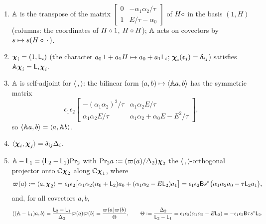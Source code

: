 \begin{prop}
\label{prop:lea-A}
\begin{enumerate}
\item $\mathbb{A}$ is the transpose of the matrix $\begin{bmatrix}0 & -\alpha_1\alpha_2/\tau\\ 1 & E/\tau-\alpha_0\end{bmatrix}$ of $H\circ$ in the basis $(1,H)$ (columns: the coordinates of $H\circ 1$, $H\circ H$); $\mathbb{A}$ acts on covectors by $s\mapsto s(H\circ\,\cdot\,)$.
\item $\boldsymbol{\chi}_i = (1,\mathsf{L}_i)$ (the character $a_0\,1 + a_1H\mapsto a_0 + a_1\mathsf{L}_i$; $\boldsymbol{\chi}_i(\mathfrak{e}_j) = \delta_{ij}$) satisfies $\mathbb{A}\boldsymbol{\chi}_i = \mathsf{L}_i\boldsymbol{\chi}_i$.
\item $\mathbb{A}$ is self-adjoint for $\langle\,,\rangle$: the bilinear form $(a,b)\mapsto\langle\mathbb{A} a,b\rangle$ has the symmetric matrix
\[
\epsilon_1\epsilon_2\begin{bmatrix}-(\alpha_1\alpha_2)^2/\tau & \alpha_1\alpha_2E/\tau\\ \alpha_1\alpha_2E/\tau & \alpha_1\alpha_2+\alpha_0E - E^2/\tau\end{bmatrix},
\]
so $\langle\mathbb{A} a,b\rangle = \langle a,\mathbb{A} b\rangle$.
\item $\langle\boldsymbol{\chi}_i,\boldsymbol{\chi}_j\rangle = \delta_{ij}\Delta_i$.
\item $\mathbb{A} - \mathsf{L}_1 = (\mathsf{L}_2-\mathsf{L}_1)\mathrm{Pr}_2$ with $\mathrm{Pr}_2a := (\varpi(a)/\Delta_2)\boldsymbol{\chi}_2$ the $\langle\,,\rangle$-orthogonal projector onto $\mathbb{C}\boldsymbol{\chi}_2$ along $\mathbb{C}\boldsymbol{\chi}_1$, where
\[
\varpi(a) := \langle a,\boldsymbol{\chi}_2\rangle = \epsilon_1\epsilon_2\bigl[\alpha_1\alpha_2(\alpha_0+\mathsf{L}_2)a_0 + (\alpha_1\alpha_2 - E\mathsf{L}_2)a_1\bigr] = \epsilon_1\epsilon_2\mathsf{B}s^{\ast}\bigl(\alpha_1\alpha_2a_0 - \tau\mathsf{L}_2a_1\bigr),
\]
and, for all covectors $a,b$,
\begin{equation}
\label{eq:lea-proj}
\langle(\mathbb{A}-\mathsf{L}_1)a,b\rangle = \frac{\mathsf{L}_2-\mathsf{L}_1}{\Delta_2}\varpi(a)\varpi(b) = \frac{\varpi(a)\varpi(b)}{\Theta},\qquad
\Theta := \frac{\Delta_2}{\mathsf{L}_2-\mathsf{L}_1} = \epsilon_1\epsilon_2(\alpha_1\alpha_2 - E\mathsf{L}_2) = -\epsilon_1\epsilon_2\mathsf{B}\tau s^{\ast}\mathsf{L}_2 .
\end{equation}
\end{enumerate}
\end{prop}

